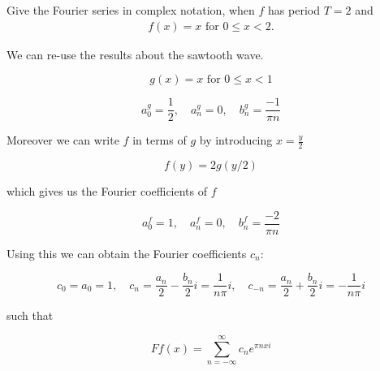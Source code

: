 \documentclass[11pt]{article}
\begin{document}
\begin{exercise}
    Give the Fourier series in complex notation, when $f$ has period $T = 2$ and 
    \begin{gather*}
        f(x) = x \text{ for } 0 \leq x < 2.
    \end{gather*}
\end{exercise}
\begin{solution}     
We can re-use the results about the sawtooth wave.

\begin{equation*}
g(x)=x \text { for } 0 \leq x<1
\end{equation*}

\begin{equation*}
a_0^g = \frac{1}{2},\quad a_n^g = 0, \quad b_n^g = \frac{-1}{\pi n}
\end{equation*}

Moreover we can write $f$ in terms of $g$ by introducing $x = \frac{y}{2}$

$$
f(y) = 2g(y/2)
$$

which gives us the Fourier coefficients of $f$

\begin{equation*}
a_0^f = 1,\quad a_n^f = 0, \quad b_n^f = \frac{-2}{\pi n}
\end{equation*}

Using this we can obtain the Fourier coefficients $c_n$:

$$
c_0 = a_0 = 1,\quad c_n=\frac{a_n}{2}-\frac{b_n}{2} i = \frac{1}{n\pi}i, \quad c_{-n}=\frac{a_n}{2}+\frac{b_n}{2} i = -\frac{1}{n\pi}i
$$

such that 

$$
F f(x)=\sum_{n=-\infty}^{\infty} c_n e^{\pi n x i}
$$
\end{solution}
\end{document}
